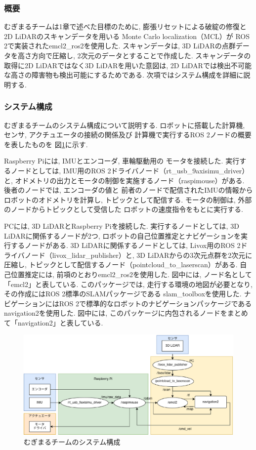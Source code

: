\subsubsection{概要}
むぎまるチームは1章で述べた目標のために, 
膨張リセット\cite{ueda2004iros}による破綻の修復と
2D LiDARのスキャンデータを用いる
Monte Carlo localization（MCL）\cite{fox1999etal}が
ROS 2で実装されたemcl2\_ros2\cite{emcl2_ros2}を使用した. 
スキャンデータは, 3D LiDARの点群データを高さ方向で圧縮し, 
2次元のデータとすることで作成した. 
スキャンデータの取得に2D LiDARではなく3D LiDARを用いた意図は, 
2D LiDARでは検出不可能な高さの障害物も検出可能にするためである. 
次項ではシステム構成を詳細に説明する. 

\subsubsection{システム構成}
むぎまるチームのシステム構成について説明する. 
ロボットに搭載した計算機, センサ, アクチュエータの接続の関係及び
計算機で実行するROS 2ノードの概要を表したものを
図\ref{fig:mugimaru_system}に示す. 

Raspberry Piには, IMUとエンコーダ, 車輪駆動用の
モータを接続した. 
実行するノードとしては, IMU用のROS 2ドライバノード（rt\_usb\_9axisimu\_driver）と, 
オドメトリの出力とモータの制御を実施するノード（raspimouse）がある. 
後者のノードでは, エンコーダの値と
前者のノードで配信されたIMUの情報からロボットのオドメトリを計算し, 
トピックとして配信する. 
モータの制御は, 外部のノードからトピックとして受信した
ロボットの速度指令をもとに実行する. 

PCには, 3D LiDARとRaspberry Piを接続した. 
実行するノードとしては, 3D LiDARに関係するノードが2つ, 
ロボットの自己位置推定とナビゲーションを実行するノードがある. 
3D LiDARに関係するノードとしては, Livox用のROS 2ドライバノード（livox\_lidar\_publisher）と, 
3D LiDARからの3次元点群を2次元に圧縮し, 
トピックとして配信するノード（pointcloud\_to\_laserscan）がある. 
自己位置推定には, 前項のとおりemcl2\_ros2を使用した. 
図中には, ノード名として「emcl2」と表している. 
このパッケージでは, 走行する環境の地図が必要となり, 
その作成にはROS 2標準のSLAMパッケージである
slam\_toolbox\cite{slam_toolbox}を使用した. 
ナビゲーションにはROS 2で標準的なロボットのナビゲーションパッケージである
navigation2\cite{nav2}を使用した. 
図中には, このパッケージに内包されるノードをまとめて「navigation2」と表している. 

\begin{figure}[h]
  \begin{center}
    \includegraphics[width=1.0\linewidth]{figs/mugimaru_system_2024.eps}
    \caption{むぎまるチームのシステム構成}
    \label{fig:mugimaru_system}
  \end{center}
\end{figure}


